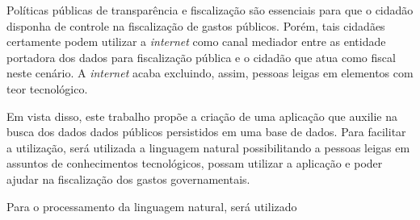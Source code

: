 Políticas públicas de transparência e fiscalização são essenciais para que o cidadão disponha de controle na fiscalização de gastos públicos. Porém, tais cidadães certamente podem utilizar a \textit{internet} como canal mediador entre as entidade portadora dos dados para fiscalização pública e o cidadão que atua como fiscal neste cenário. A \textit{internet} acaba excluindo, assim, pessoas leigas em elementos com teor tecnológico.

Em vista disso, este trabalho propõe a criação de uma aplicação que auxilie na busca dos dados dados públicos persistidos em uma base de dados. Para facilitar a utilização, será utilizada a linguagem natural possibilitando a pessoas leigas em assuntos de conhecimentos tecnológicos, possam utilizar a aplicação e poder ajudar na fiscalização dos gastos governamentais.

Para o processamento da linguagem natural, será utilizado 
